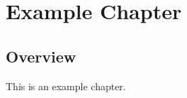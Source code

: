 \documentclass[../thesis.tex]{subfiles}
\begin{document}
\chapter{Example Chapter}

\section{Overview}

This is an example chapter.

\ifSubfilesClassLoaded{%
    \printbibliography[heading=chapterbibliography,segment=\therefsegment]
}{}
\end{document}
